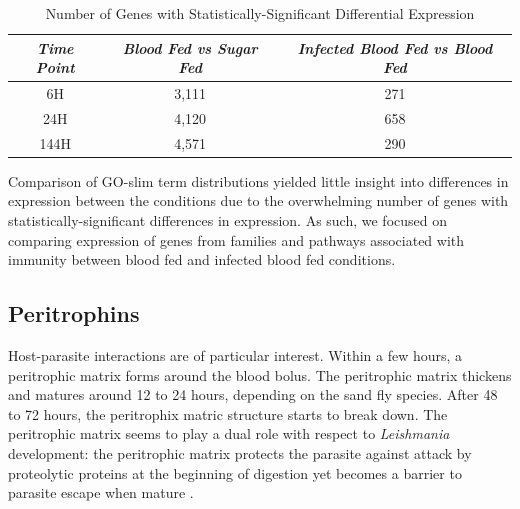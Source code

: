 \begin{table}[H]
  \centering
  \begin{tabular}{c c c} \hline
  \emph{Time Point} & \emph{Blood Fed vs Sugar Fed} & \emph{Infected Blood Fed vs Blood Fed} \\ \hline
  6H & 3,111 & 271 \\
  24H & 4,120 & 658 \\
  144H & 4,571 & 290 \\
  \end{tabular}
  \caption{Number of Genes with Statistically-Significant Differential Expression}
  \label{tab:stat-sig-genes}
\end{table}

Comparison of GO-slim term distributions yielded little insight into differences in expression between the conditions due to the overwhelming number of genes with statistically-significant differences in expression.  As such, we focused on comparing expression of genes from families and pathways associated with immunity between blood fed and infected blood fed conditions.



\subsection{Peritrophins}
Host-parasite interactions are of particular interest.  Within a few hours, a peritrophic matrix forms around the blood bolus.  The peritrophic matrix thickens and matures around 12 to 24 hours, depending on the sand fly species.  After 48 to 72 hours, the peritrophix matric structure starts to break down.  The peritrophic matrix seems to play a dual role with respect to \emph{Leishmania} development: the peritrophic matrix protects the parasite against attack by proteolytic proteins at the beginning of digestion yet becomes a barrier to parasite escape when mature \cite{Dostalova2012}.

